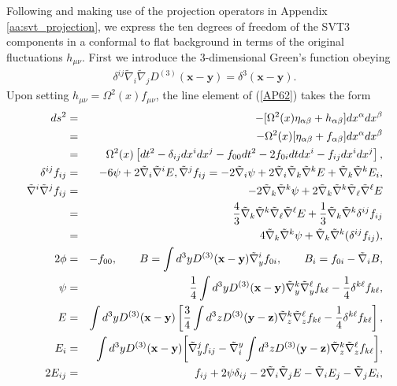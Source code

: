 Following \cite{amarasinghe_2019, phelps_2019} and making use of the projection operators in Appendix \ref{aa:svt_projection}, we express the ten degrees of freedom of the SVT3 components in a conformal to flat background in terms of the original fluctuations $h_{\mu\nu}$. First we introduce the 3-dimensional Green's function obeying
%
\begin{eqnarray}
\delta^{ij}\tilde{\nabla}_i\tilde{\nabla}_jD^{(3)}(\mathbf{x}-\mathbf{y})=\delta^3(\mathbf{x}-\mathbf{y}).
\label{AP64}
\end{eqnarray}
%
Upon setting $h_{\mu\nu}=\Omega^2(x)f_{\mu\nu}$, the line element of (\ref{AP62}) takes the form 
%
\begin{eqnarray}
ds^2&=&-[\Omega^2(x)\eta_{\alpha\beta}+h_{\alpha\beta}]dx^{\alpha}dx^{\beta}
\nonumber\\
&=&-\Omega^2(x)[\eta_{\alpha\beta}+f_{\alpha\beta}]dx^{\alpha}dx^{\beta}
\nonumber\\
&=&\Omega^2(x)\left[dt^2-\delta_{ij}dx^idx^j-f_{00}dt^2-2f_{0i}dtdx^i-f_{ij}dx^idx^j\right],
\nonumber\\
\delta^{ij}f_{ij}&=&-6\psi+2\tilde{\nabla}_i\tilde{\nabla}^iE,
\tilde{\nabla}^jf_{ij}=-2\tilde{\nabla}_i\psi+2\tilde{\nabla}_i\tilde{\nabla}_k\tilde{\nabla}^kE+\tilde{\nabla}_k\tilde{\nabla}^kE_{i},
\nonumber\\
\tilde{\nabla}^i \tilde{\nabla}^jf_{ij}&=&-2\tilde{\nabla}_k\tilde{\nabla}^k\psi+2\tilde{\nabla}_k\tilde{\nabla}^k\tilde{\nabla}_{\ell}\tilde{\nabla}^{\ell}E
\nonumber\\
&=&\frac{4}{3}\tilde{\nabla}_k\tilde{\nabla}^k\tilde{\nabla}_{\ell}\tilde{\nabla}^{\ell}E+\frac{1}{3}\tilde{\nabla}_k\tilde{\nabla}^k\delta^{ij}f_{ij}
\nonumber\\
&=&4\tilde{\nabla}_k\tilde{\nabla}^k\psi+\tilde{\nabla}_k\tilde{\nabla}^k(\delta^{ij}f_{ij}),
\nonumber\\
2\phi&=&-f_{00},\qquad
B=\int d^3yD^{(3)}(\mathbf{x}-\mathbf{y})\tilde{\nabla}_y^if_{0i},\qquad B_i=f_{0i}-\tilde{\nabla}_iB,
\nonumber\\
\psi&=&\frac{1}{4}\int d^3yD^{(3)}(\mathbf{x}-\mathbf{y})\tilde{\nabla}_y^k\tilde{\nabla}_y^{\ell}f_{k\ell}-\frac{1}{4}\delta^{k\ell}f_{k\ell},
\nonumber\\
\qquad
E&=&\int d^3yD^{(3)}(\mathbf{x}-\mathbf{y})\left[\frac{3}{4}\int d^3zD^{(3)}(\mathbf{y}-\mathbf{z})\tilde{\nabla}_z^k\tilde{\nabla}_z^{\ell}f_{k\ell}-\frac{1}{4}\delta^{k\ell}f_{k\ell}\right],
\nonumber\\
E_i&=&\int d^3yD^{(3)}(\mathbf{x}-\mathbf{y})\bigg{[}\tilde{\nabla}_y^jf_{ij}
-\tilde{\nabla}^y_i\int d^3zD^{(3)}(\mathbf{y}-\mathbf{z})\tilde{\nabla}_z^k\tilde{\nabla}_z^{\ell}f_{k\ell}\bigg{]},
\nonumber\\
2E_{ij}&=&f_{ij}+2\psi\delta_{ij} -2\tilde{\nabla}_i\tilde{\nabla}_j E - \tilde{\nabla}_i E_j - \tilde{\nabla}_j E_i, 
\label{AP65}
\end{eqnarray}
